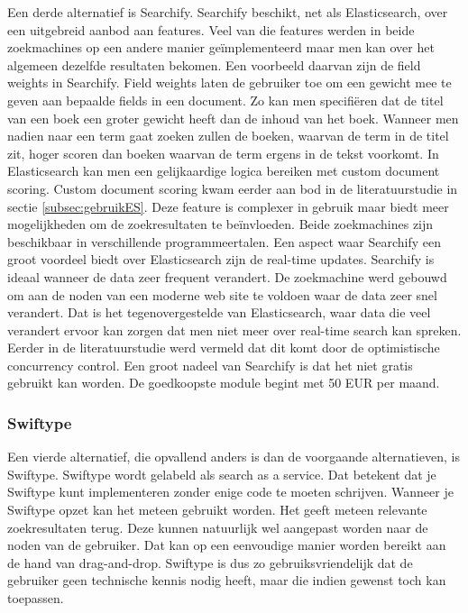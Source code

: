 Een derde alternatief is Searchify. Searchify beschikt, net als Elasticsearch, over een uitgebreid aanbod aan features. Veel van die features werden in beide zoekmachines op een andere manier geïmplementeerd maar men kan over het algemeen dezelfde resultaten bekomen. Een voorbeeld daarvan zijn de field weights in Searchify. Field weights laten de gebruiker toe om een gewicht mee te geven aan bepaalde fields in een document. Zo kan men specifiëren dat de titel van een boek een groter gewicht heeft dan de inhoud van het boek. Wanneer men nadien naar een term gaat zoeken zullen de boeken, waarvan de term in de titel zit, hoger scoren dan boeken waarvan de  term ergens in de tekst voorkomt. In Elasticsearch kan men een gelijkaardige logica bereiken met custom document scoring. Custom document scoring kwam eerder aan bod in de literatuurstudie in sectie \ref{subsec:gebruikES}. Deze feature is complexer in gebruik maar biedt meer mogelijkheden om de zoekresultaten te beïnvloeden. Beide zoekmachines zijn beschikbaar in verschillende programmeertalen. Een aspect waar Searchify een groot voordeel biedt over Elasticsearch zijn de real-time updates. Searchify is ideaal wanneer de data zeer frequent verandert. De zoekmachine werd gebouwd om aan de noden van een moderne web site te voldoen waar de data zeer snel verandert. Dat is het tegenovergestelde van Elasticsearch, waar data die veel verandert ervoor kan zorgen dat men niet meer over real-time search kan spreken. Eerder in de literatuurstudie werd vermeld dat dit komt door de optimistische concurrency control. Een groot nadeel van Searchify is dat het niet gratis gebruikt kan worden. De goedkoopste module begint met 50 EUR per maand.

\subsubsection{Swiftype}

Een vierde alternatief, die opvallend anders is dan de voorgaande alternatieven, is Swiftype. Swiftype wordt gelabeld als search as a service. Dat betekent dat je Swiftype kunt implementeren zonder enige code te moeten schrijven. Wanneer je Swiftype opzet kan het meteen gebruikt worden. Het geeft meteen relevante zoekresultaten terug. Deze kunnen natuurlijk wel aangepast worden naar de noden van de gebruiker. Dat kan op een eenvoudige manier worden bereikt aan de hand van drag-and-drop. Swiftype is dus zo gebruiksvriendelijk dat de gebruiker geen technische kennis nodig heeft, maar die indien gewenst toch kan toepassen.

